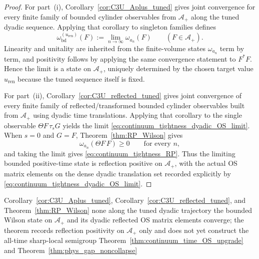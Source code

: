 \begin{proof}
For part~(i), Corollary~\ref{cor:C3U_Aplus_tuned} gives joint convergence for every finite family of bounded cylinder observables from $\mathcal A_+$ along the tuned dyadic sequence. Applying that corollary to singleton families defines
\[
\omega_{\mathrm{bd}}^{(u_{\mathrm{ren}})}(F):=\lim_{n\to\infty}\omega_{a_n}(F)
\qquad (F\in\mathcal A_+).
\]
Linearity and unitality are inherited from the finite-volume states $\omega_{a_n}$ term by term, and positivity follows by applying the same convergence statement to $F^*F$. Hence the limit is a state on $\mathcal A_+$, uniquely determined by the chosen target value $u_{\mathrm{ren}}$ because the tuned sequence itself is fixed.

For part~(ii), Corollary~\ref{cor:C3U_reflected_tuned} gives joint convergence of every finite family of reflected/transformed bounded cylinder observables built from $\mathcal A_+$ using dyadic time translations. Applying that corollary to the single observable $\Theta F\,\tau_s G$ yields the limit \eqref{eq:continuum_tightness_dyadic_OS_limit}. When $s=0$ and $G=F$, Theorem~\ref{thm:RP_Wilson} gives
\[
\omega_{a_n}(\Theta F\,F)\ge 0
\qquad\text{for every }n,
\]
and taking the limit gives \eqref{eq:continuum_tightness_RP}. Thus the limiting bounded positive-time state is reflection positive on $\mathcal A_+$, with the actual OS matrix elements on the dense dyadic translation set recorded explicitly by \eqref{eq:continuum_tightness_dyadic_OS_limit}.
\end{proof}

\dependencyledger
  {Corollary~\ref{cor:C3U_Aplus_tuned}, Corollary~\ref{cor:C3U_reflected_tuned}, and Theorem~\ref{thm:RP_Wilson}}
  {none}
  {along the tuned dyadic trajectory the bounded Wilson state on $\mathcal A_+$ and its dyadic reflected OS matrix elements converge; the theorem records reflection positivity on $\mathcal A_+$ only and does not yet construct the all-time sharp-local semigroup}
  {Theorem~\ref{thm:continuum_time_OS_upgrade} and Theorem~\ref{thm:phys_gap_noncollapse}}

